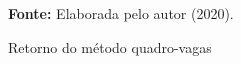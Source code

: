 \begin{figure}[ht!]
\centering

\caption{\textmd{Retorno do método quadro-vagas}}
\label{fig:retquadrovagas}

\par\medskip\textbf{Fonte:} Elaborada pelo autor (2020). \par\medskip

\end{figure}

